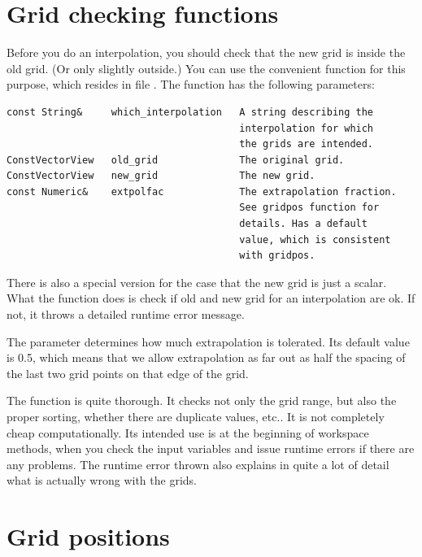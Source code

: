\section{Grid checking functions}
\label{sec:interpolation:gridchecking}

Before you do an interpolation, you should check that the new grid is
inside the old grid. (Or only slightly outside.) You can use the
convenient function  for this
purpose, which resides in file . The
function has the following parameters:

{\small
\begin{verbatim}
const String&     which_interpolation   A string describing the 
                                        interpolation for which 
                                        the grids are intended. 
ConstVectorView   old_grid              The original grid.
ConstVectorView   new_grid              The new grid.
const Numeric&    extpolfac             The extrapolation fraction. 
                                        See gridpos function for 
                                        details. Has a default 
                                        value, which is consistent 
                                        with gridpos.  
\end{verbatim}
}

There is also a special version for the case that the new grid is just
a scalar. What the function does is check if old and new grid for an
interpolation are ok. If not, it throws a detailed runtime error
message. 

The parameter  determines how much extrapolation
is tolerated. Its default value is 0.5, which means that we allow
extrapolation as far out as half the spacing of the last two grid
points on that edge of the grid.

The  function is quite thorough.
It checks not only the grid range, but also the proper sorting,
whether there are duplicate values, etc.. It is not completely cheap
computationally. Its intended use is at the beginning of workspace
methods, when you check the input variables and issue runtime errors
if there are any problems. The runtime error thrown also explains in
quite a lot of detail what is actually wrong with the grids.
  

\section{Grid positions}
\label{sec:interpolation:gridpos}

